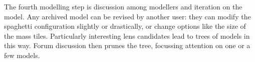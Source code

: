 The fourth modelling step is discussion among modellers and iteration
on the model.  Any archived model can be revised by another user: they
can modify the spaghetti configuration slightly or drastically, or
change options like the size of the mass tiles.  Particularly
interesting lens candidates lead to trees of models in this way.
Forum discussion then prunes the tree, focussing attention on one or a
few models.


